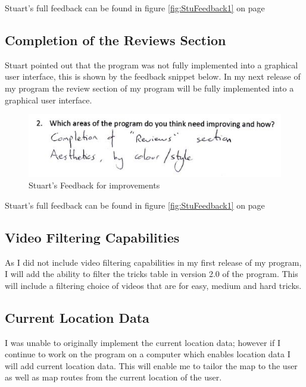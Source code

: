 Stuart's full feedback can be found in figure \ref{fig:StuFeedback1} on page \pageref{fig:StuFeedback1}

	\subsection{Completion of the Reviews Section}

Stuart pointed out that the program was not fully implemented into a graphical user interface, this is shown by the feedback snippet below. In my next release of my program the review section of my program will be fully implemented into a graphical user interface.

\begin{figure}[H]
    \includegraphics[width=\textwidth]{./Evaluation/images/StuImprovements.jpg}
    \caption{Stuart's Feedback for improvements} \label{fig:StuImprovementFeedback}
\end{figure}

Stuart's full feedback can be found in figure \ref{fig:StuFeedback1} on page \pageref{fig:StuFeedback1}


	\subsection{Video Filtering Capabilities}

As I did not include video filtering capabilities in my first release of my program, I will add the ability to filter the tricks table in version 2.0 of the program. This will include a filtering choice of videos that are for easy, medium and hard tricks.


	\subsection{Current Location Data}

I was unable to originally implement the current location data; however if I continue to work on the program on a computer which enables location data I will add current location data. This will enable me to tailor the map to the user as well as map routes from the current location of the user.

